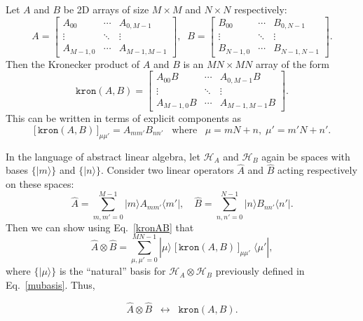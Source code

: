 \documentclass[pra,12pt]{revtex4}
\begin{document}
Let $A$ and $B$ be 2D arrays of size $M\times M$ and $N\times N$
respectively:
\begin{equation}
  A = \begin{bmatrix}A_{00} & \cdots & A_{0,M-1} \\ \vdots & \ddots & \vdots \\ A_{M-1,0} & \cdots & A_{M-1,M-1} \end{bmatrix}, \;\;
  B = \begin{bmatrix}B_{00} & \cdots & B_{0,N-1} \\ \vdots & \ddots & \vdots \\  B_{N-1,0} & \cdots & B_{N-1,N-1} \end{bmatrix}.
\end{equation}
Then the Kronecker product of $A$ and $B$ is an $MN\times MN$ array of
the form
\begin{equation}
  \texttt{kron}(A,B) = \begin{bmatrix} A_{00}B & \cdots & A_{0,M-1}B \\ \vdots & \ddots & \vdots \\ A_{M-1,0}B & \cdots & A_{M-1,M-1}B\end{bmatrix}.
    \label{kronAB_explicit}
\end{equation}
This can be written in terms of explicit components as
\begin{equation}
  \big[\,\texttt{kron}(A,B)\,\big]_{\mu\mu'} = A_{mm'} B_{nn'}\;\;\;\mathrm{where}\;\;\;\mu = mN+n, \; \mu' = m'N+n'.
  \label{kronAB}
\end{equation}

In the language of abstract linear algebra, let $\mathscr{H}_A$ and
$\mathscr{H}_B$ again be spaces with bases $\{|m\rangle\}$ and
$\{|n\rangle\}$.  Consider two linear operators $\hat{A}$ and
$\hat{B}$ acting respectively on these spaces:
\begin{equation}
  \hat{A} = \sum_{m,m'=0}^{M-1}  |m\rangle A_{mm'} \langle m'|, \quad \hat{B} = \sum_{n,n'=0}^{N-1} |n\rangle B_{nn'}\langle n'|.
\end{equation}
Then we can show using Eq.~\eqref{kronAB} that
\begin{equation}
  \hat{A}\otimes\hat{B} = \sum_{\mu,\mu'=0}^{MN-1} |\mu\rangle \; \big[\,\texttt{kron}(A,B)\,\big]_{\mu\mu'} \; \langle\mu'|,
\end{equation}
where $\big\{|\mu\rangle\big\}$ is the ``natural'' basis for
$\mathscr{H}_A\otimes\mathscr{H}_B$ previously defined in
Eq.~\eqref{mubasis}.  Thus,
\begin{framed}
  \begin{equation}
    \hat{A}\otimes\hat{B} \;\;\leftrightarrow\;\;
    \texttt{kron}(A,B).
    \label{result2}
  \end{equation}
\end{framed}
\end{document}

